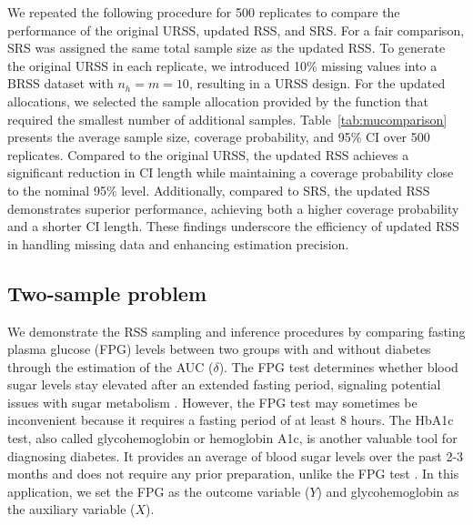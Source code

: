 We repeated the following procedure for 500 replicates to compare the performance of the original URSS, updated RSS, and SRS. For a fair comparison, SRS was assigned the same total sample size as the updated RSS. To generate the original URSS in each replicate, we introduced 10\% missing values into a BRSS dataset with $n_h=m = 10$, resulting in a URSS design. For the updated allocations, we selected the sample allocation provided by the  function that required the smallest number of additional samples. Table~\ref{tab:mucomparison} presents the average sample size, coverage probability, and 95\% CI over 500 replicates. Compared to the original URSS, the updated RSS achieves a significant reduction in CI length while maintaining a coverage probability close to the nominal 95\% level. Additionally, compared to SRS, the updated RSS demonstrates superior performance, achieving both a higher coverage probability and a shorter CI length. These findings underscore the efficiency of updated RSS in handling missing data and enhancing estimation precision.
\begin{table}[!ht]
\centering
{}
\caption{Comparison of mean inference results from RSS and SRS over 500 replicates.}\label{tab:mucomparison}
\end{table}

\subsection{Two-sample problem}\label{sec:app-two}

We demonstrate the RSS sampling and inference procedures by comparing fasting plasma glucose (FPG) levels between two groups with and without diabetes through the estimation of the AUC ($\delta$). The FPG test determines whether blood sugar levels stay elevated after an extended fasting period, signaling potential issues with sugar metabolism \citep{american2022standards}. However, the FPG test may sometimes be inconvenient because it requires a fasting period of at least 8 hours. The HbA1c test, also called glycohemoglobin or hemoglobin A1c, is another valuable tool for diagnosing diabetes. It provides an average of blood sugar levels over the past 2-3 months and does not require any prior preparation, unlike the FPG test \citep{american2022standards}. In this application, we set the FPG as the outcome variable ($Y$) and glycohemoglobin as the auxiliary variable ($X$). 

